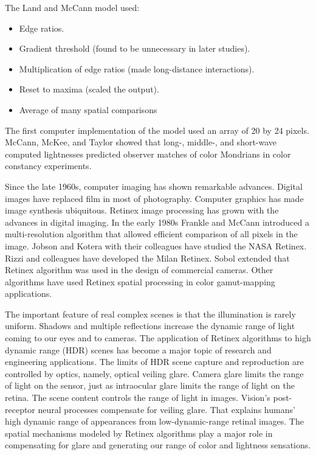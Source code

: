 The Land and McCann model used:
\begin{itemize}
	\item Edge ratios.
	\item Gradient threshold (found to be unnecessary in later studies).
	\item Multiplication of edge ratios (made long-distance interactions).
	\item Reset to maxima (scaled the output).
	\item Average of many spatial comparisons
\end{itemize}

The first computer implementation of the model used an array of 20 by 24 pixels. McCann, McKee, and Taylor showed that long-, middle-, and short-wave computed lightnesses predicted observer matches of color Mondrians in color constancy experiments.

Since the late 1960s, computer imaging has shown remarkable advances. Digital images have replaced film in most of photography. Computer graphics has made image synthesis ubiquitous. Retinex image processing has grown with the advances in digital imaging. In the early 1980s Frankle and McCann introduced a multi-resolution algorithm that allowed efficient comparison of all pixels in the image. Jobson and Kotera with their colleagues have studied the NASA Retinex. Rizzi and colleagues have developed the Milan Retinex. Sobol extended that Retinex algorithm was used in the design of commercial cameras. Other algorithms have used Retinex spatial processing in color gamut-mapping applications.

The important feature of real complex scenes is that the illumination is rarely uniform. Shadows and multiple reflections increase the dynamic range of light coming to our eyes and to cameras. The application of Retinex algorithms to high dynamic range (HDR) scenes has become a major topic of research and engineering applications. The limits of HDR scene capture and reproduction are controlled by optics, namely, optical veiling glare. Camera glare limits the range of light on the sensor, just as intraocular glare limits the range of light on the retina. The scene content controls the range of light in images. Vision’s post-receptor neural processes compensate for veiling glare. That explains humans’ high dynamic range of appearances from low-dynamic-range retinal images. The spatial mechanisms modeled by Retinex algorithms play a major role in compensating for glare and generating our range of color and lightness sensations.

